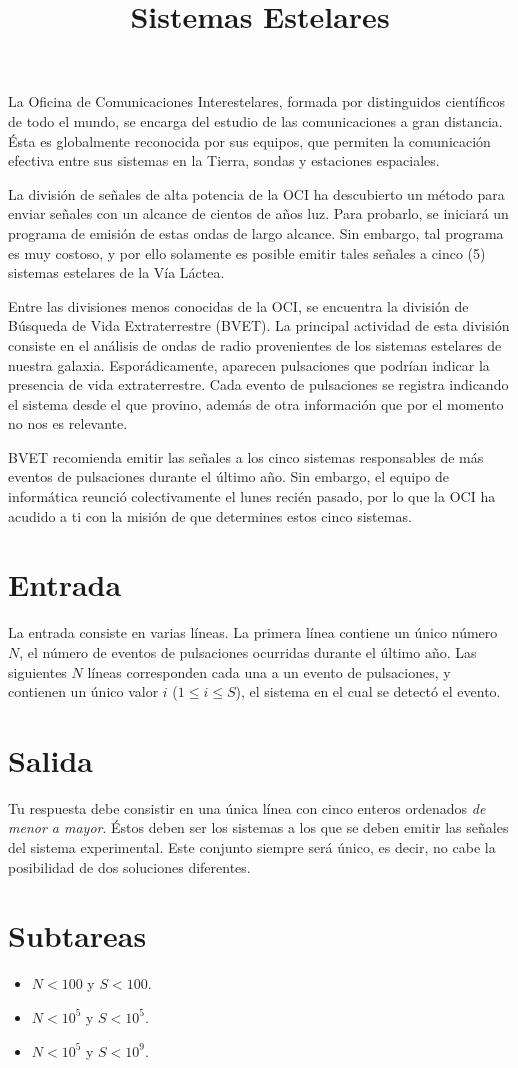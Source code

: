 \documentclass{article}
\title{Sistemas Estelares}
\begin{document}
\maketitle

La Oficina de Comunicaciones Interestelares, formada por distinguidos científicos de todo el mundo, se encarga del estudio de las comunicaciones a gran distancia.
Ésta es globalmente reconocida por sus equipos, que permiten la comunicación efectiva entre sus sistemas en la Tierra, sondas y estaciones espaciales.

La división de señales de alta potencia de la OCI ha descubierto un método para enviar señales con un alcance de cientos de años luz.
Para probarlo, se iniciará un programa de emisión de estas ondas de largo alcance.
Sin embargo, tal programa es muy costoso, y por ello solamente es posible emitir tales señales a cinco (5) sistemas estelares de la Vía Láctea.

Entre las divisiones menos conocidas de la OCI, se encuentra la división de Búsqueda de Vida Extraterrestre (BVET).
La principal actividad de esta división consiste en el análisis de ondas de radio provenientes de los sistemas estelares de nuestra galaxia.
Esporádicamente, aparecen pulsaciones que podrían indicar la presencia de vida extraterrestre.
Cada evento de pulsaciones se registra indicando el sistema desde el que provino, además de otra información que por el momento no nos es relevante.

BVET recomienda emitir las señales a los cinco sistemas responsables de más eventos de pulsaciones durante el último año.
Sin embargo, el equipo de informática reunció colectivamente el lunes recién pasado, por lo que la OCI ha acudido a ti con la misión de que determines estos cinco sistemas.

\section*{Entrada}
La entrada consiste en varias líneas.
La primera línea contiene un único número $N$, el número de eventos de pulsaciones ocurridas durante el último año.
Las siguientes $N$ líneas corresponden cada una a un evento de pulsaciones, y contienen un único valor $i$ ($1 \le i \le S$), el sistema en el cual se detectó el evento.

\section*{Salida}
Tu respuesta debe consistir en una única línea con cinco enteros ordenados \emph{de menor a mayor}.
Éstos deben ser los sistemas a los que se deben emitir las señales del sistema experimental.
Este conjunto siempre será único, es decir, no cabe la posibilidad de dos soluciones diferentes.

\section*{Subtareas}
\begin{itemize}
  \item $N < 100$ y $S < 100$. %
  \item $N < 10^5$ y $S < 10^5$. %
  \item $N < 10^5$ y $S < 10^9$. %
\end{itemize}
\end{document}
